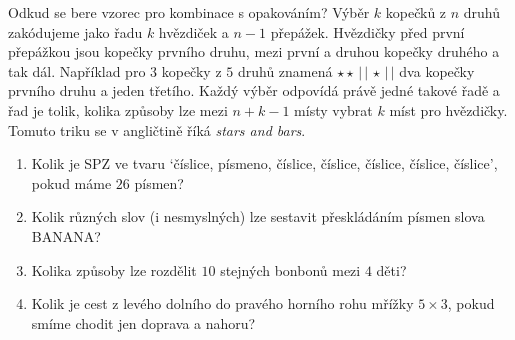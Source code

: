 Odkud se bere vzorec pro kombinace s opakováním? Výběr $k$ kopečků z $n$ druhů zakódujeme jako řadu $k$ hvězdiček a $n - 1$ přepážek. Hvězdičky před první přepážkou jsou kopečky prvního druhu, mezi první a druhou kopečky druhého a tak dál. Například pro $3$ kopečky z $5$ druhů znamená $\star\star\,|\,|\,\star\,|\,|$ dva kopečky prvního druhu a jeden třetího. Každý výběr odpovídá právě jedné takové řadě a řad je tolik, kolika způsoby lze mezi $n + k - 1$ místy vybrat $k$ míst pro hvězdičky. Tomuto triku se v angličtině říká \textit{stars and bars}.
\begin{center}
\end{center}

\begin{problem}
  \begin{enumerate}[label=(\alph*)]
    \item Kolik je SPZ ve tvaru `číslice, písmeno, číslice, číslice, číslice, číslice, číslice', pokud máme $26$ písmen?
    \item Kolik různých slov (i nesmyslných) lze sestavit přeskládáním písmen slova BANANA?
    \item Kolika způsoby lze rozdělit $10$ stejných bonbonů mezi $4$ děti?
    \item Kolik je cest z levého dolního do pravého horního rohu mřížky $5\times 3$, pokud smíme chodit jen doprava a nahoru?
  \end{enumerate}
\end{problem}

